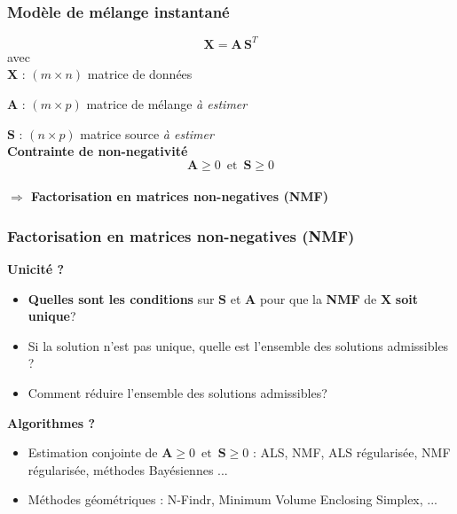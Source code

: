 \documentclass[9pt]{beamer}
\begin{document}
\begin{frame}
\frametitle{Modèle de mélange instantané}
$$
\mathbf{X} = \mathbf{A} \, \mathbf{S}^T
$$
avec
\\[2ex] 
$\mathbf{X}$ : $(m \times n)$ matrice de données

$\mathbf{A}$ : $(m \times p)$ matrice de mélange \emph{à estimer}

$\mathbf{S}$ : $(n \times p)$ matrice source \emph{à estimer}
\\[2ex] 
{\bf Contrainte de non-negativité}
\begin{equation*}
 \label{eq.2} \mathbf{A} \geq 0 \, \text{ et } \, \mathbf{S} \geq 0
\end{equation*}
\\[2ex] 
{\bf $\Rightarrow$ Factorisation en matrices non-negatives (NMF) }

\end{frame}


\begin{frame}
\frametitle{Factorisation en matrices non-negatives (NMF)}
\begin{center}
\textbf{Unicité ?}
\end{center}

\begin{itemize}
\item \textbf{Quelles sont les conditions} sur $\mathbf{S}$ et
$\mathbf{A}$ pour que la \textbf{NMF} de $\mathbf{X}$ \textbf{soit unique}?
\item Si la solution n'est pas unique, quelle est l'ensemble des solutions admissibles ?
\item Comment réduire l'ensemble des solutions admissibles?
\end{itemize}
\begin{center}
\textbf{Algorithmes ?}
\end{center}
\begin{itemize}
\item Estimation conjointe de $\mathbf{A} \geq 0 \, \text{ et } \, \mathbf{S} \geq 0$ : ALS, NMF,  ALS régularisée, NMF régularisée, méthodes Bayésiennes ...
\item Méthodes géométriques : N-Findr, Minimum Volume Enclosing Simplex, ...
\end{itemize} 

\end{frame}
\end{document}
